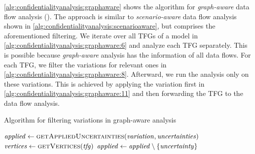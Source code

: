 \autoref{alg:confidentialityanalysis:graphaware} shows the algorithm for \emph{graph-aware} data flow analysis ().
The approach is similar to \emph{scenario-aware} data flow analysis shown in \autoref{alg:confidentialityanalysis:scenarioaware}, but comprises the aforementioned filtering.
We iterate over all \acp{TFG} of a model in \autoref{alg:confidentialityanalysis:graphaware:6} and analyze each \ac{TFG} separately.
This is possible because \emph{graph-aware} analysis has the information of all data flows.
For each \ac{TFG}, we filter the variations for relevant ones in \autoref{alg:confidentialityanalysis:graphaware:8}.
Afterward, we run the analysis only on these variations.
This is achieved by applying the variation first in \autoref{alg:confidentialityanalysis:graphaware:11} and then forwarding the \ac{TFG} to the data flow analysis.

\begin{algorithm}
    \caption{Algorithm for filtering variations in graph-aware analysis}
    \label{alg:confidentialityanalysis:filtervariation}
    \begin{algorithmic}[1]
            \algindentskip

            \State $\mathit{applied} \gets \textsc{getAppliedUncertainties}(\mathit{variation, \mathit{uncertainties})}$ \label{alg:confidentialityanalysis:filtervariation:4}
            \State $\mathit{vertices} \gets \textsc{getVertices}(\mathit{tfg})$ 
             \label{alg:confidentialityanalysis:filtervariation:6}
                     \label{alg:confidentialityanalysis:filtervariation:8}
                        \State $\mathit{applied} \gets \mathit{applied} \setminus \{ \mathit{uncertainty} \}$ \label{alg:confidentialityanalysis:filtervariation:9}
                    \EndIf
                \EndFor
                \algblockskip

                 
                    \State {} \label{alg:confidentialityanalysis:filtervariation:13}
                \EndIf
            \EndFor
            \algblockskip

            \State \Return{$\emptyset$} \label{alg:confidentialityanalysis:filtervariation:17} 
            \algindentskip
        \EndProcedure   
    \end{algorithmic}
\end{algorithm}

